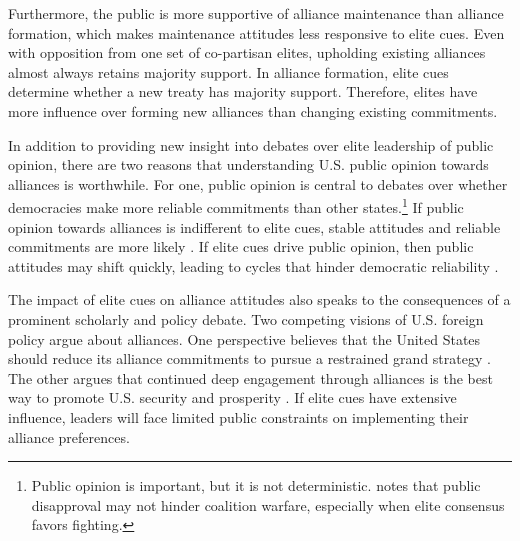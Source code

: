 \documentclass[12pt]{article}
\begin{document}
Furthermore, the public is more supportive of alliance maintenance than alliance formation, which makes maintenance attitudes less responsive to elite cues. 
Even with opposition from one set of co-partisan elites, upholding existing alliances almost always retains majority support. 
In alliance formation, elite cues determine whether a new treaty has majority support. 
Therefore, elites have more influence over forming new alliances than changing existing commitments. 


In addition to providing new insight into debates over elite leadership of public opinion, there are two reasons that understanding U.S. public opinion towards alliances is worthwhile. 
For one, public opinion is central to debates over whether democracies make more reliable commitments than other states.\footnote{Public opinion is important, but it is not deterministic. \citet{Kreps2010} notes that public disapproval may not hinder coalition warfare, especially when elite consensus favors fighting.} 
If public opinion towards alliances is indifferent to elite cues, stable attitudes and reliable commitments are more likely \citep{Gaubatz1996}.
If elite cues drive public opinion, then public attitudes may shift quickly, leading to cycles that hinder democratic reliability \citep{GartzkeGleditsch2004}.


The impact of elite cues on alliance attitudes also speaks to the consequences of a prominent scholarly and policy debate. 
Two competing visions of U.S. foreign policy argue about alliances. 
One perspective believes that the United States should reduce its alliance commitments to pursue a restrained grand strategy \citep{Preble2009, Posen2014}.
The other argues that continued deep engagement through alliances is the best way to promote U.S. security and prosperity \citep{Brooksetal2013, BrandsFeaver2017}. 
If elite cues have extensive influence, leaders will face limited public constraints on implementing their alliance preferences. 
\end{document}
